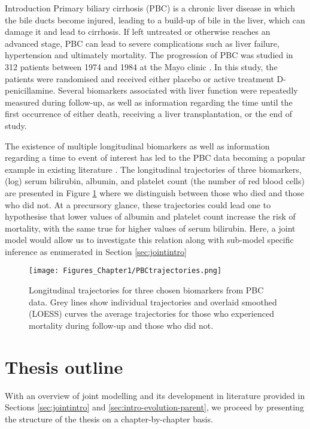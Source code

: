 \begin{chapter}{\label{cha:intro}Introduction}
  Primary biliary cirrhosis (PBC) is a chronic liver disease in which the bile ducts become injured, leading to a build-up of bile in the liver, which can damage it and lead to cirrhosis. If left untreated or otherwise reaches an advanced stage, PBC can lead to severe complications such as liver failure, hypertension and ultimately mortality. The progression of PBC was studied in 312 patients between 1974 and 1984 at the Mayo clinic \citep{PBCarticle}. In this study, the patients were randomised and received either placebo or active treatment D-penicillamine. Several biomarkers associated with liver function were repeatedly measured during follow-up, as well as information regarding the time until the first occurrence of either death, receiving a liver transplantation, or the end of study. 
  
  The existence of multiple longitudinal biomarkers as well as information regarding a time to event of interest has led to the PBC data becoming a popular example in existing literature \citep{Hickey2018, PBCapp1, PBCapp2, PBCapp3}. The longitudinal trajectories of three biomarkers, (log) serum bilirubin, albumin, and platelet count (\ie the number of red blood cells) are presented in Figure \ref{fig:PBCtrajectories} where we distinguish between those who died and those who did not. At a precursory glance, these trajectories could lead one to hypothesise that lower values of albumin and platelet count increase the risk of mortality, with the same true for higher values of serum bilirubin. Here, a joint model would allow us to investigate this relation along with sub-model specific inference as enumerated in Section \ref{sec:jointintro}
  
  \begin{figure}[h]
      \centering
      \texttt{[image: Figures\_Chapter1/PBCtrajectories.png]}
      \caption{Longitudinal trajectories for three chosen biomarkers from PBC data. Grey lines show individual trajectories and overlaid smoothed (LOESS) curves the average trajectories for those who experienced mortality during follow-up and those who did not.}
      \label{fig:PBCtrajectories}
  \end{figure}
  
  \section{Thesis outline}\label{sec:intro-thesis-outline}
  With an overview of joint modelling and its development in literature provided in Sections \ref{sec:jointintro} and \ref{sec:intro-evolution-parent}, we proceed by presenting the structure of the thesis on a chapter-by-chapter basis.
  

\end{chapter}
